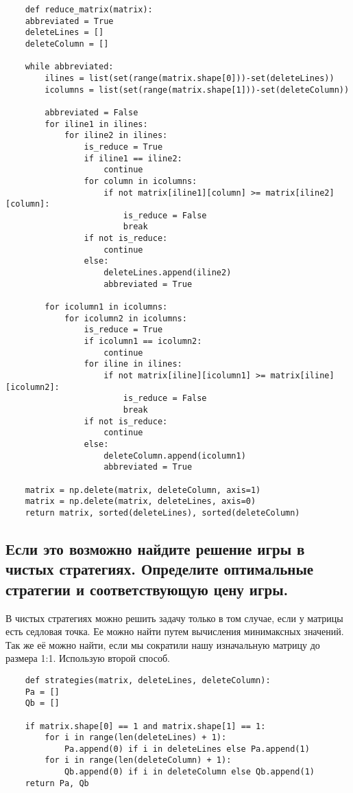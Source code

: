 \documentclass{article}
\begin{document}
\begin{listing}[H]
    \begin{verbatim}
    def reduce_matrix(matrix):
    abbreviated = True
    deleteLines = []
    deleteColumn = []

    while abbreviated:
        ilines = list(set(range(matrix.shape[0]))-set(deleteLines))
        icolumns = list(set(range(matrix.shape[1]))-set(deleteColumn))

        abbreviated = False
        for iline1 in ilines:
            for iline2 in ilines:
                is_reduce = True
                if iline1 == iline2:
                    continue
                for column in icolumns:
                    if not matrix[iline1][column] >= matrix[iline2][column]:
                        is_reduce = False
                        break
                if not is_reduce:
                    continue
                else:
                    deleteLines.append(iline2)
                    abbreviated = True
        
        for icolumn1 in icolumns:
            for icolumn2 in icolumns:
                is_reduce = True
                if icolumn1 == icolumn2:
                    continue
                for iline in ilines:
                    if not matrix[iline][icolumn1] >= matrix[iline][icolumn2]:
                        is_reduce = False
                        break
                if not is_reduce:
                    continue
                else:
                    deleteColumn.append(icolumn1)
                    abbreviated = True

    matrix = np.delete(matrix, deleteColumn, axis=1)
    matrix = np.delete(matrix, deleteLines, axis=0)
    return matrix, sorted(deleteLines), sorted(deleteColumn)
    \end{verbatim}
\end{listing}

\subsection{Если это возможно найдите решение игры в чистых стратегиях. Определите оптимальные стратегии и соответствующую цену игры.}

В чистых стратегиях можно решить задачу только в том случае, если у матрицы есть седловая точка. Ее можно найти путем вычисления минимаксных значений. Так же её можно найти, если мы сократили нашу изначальную матрицу до размера 1:1. Использую второй способ.

\begin{listing}[H]
    \begin{verbatim}
    def strategies(matrix, deleteLines, deleteColumn):
    Pa = []
    Qb = []

    if matrix.shape[0] == 1 and matrix.shape[1] == 1:
        for i in range(len(deleteLines) + 1):
            Pa.append(0) if i in deleteLines else Pa.append(1)
        for i in range(len(deleteColumn) + 1):
            Qb.append(0) if i in deleteColumn else Qb.append(1)
    return Pa, Qb
    \end{verbatim}
\end{listing}
\end{document}
